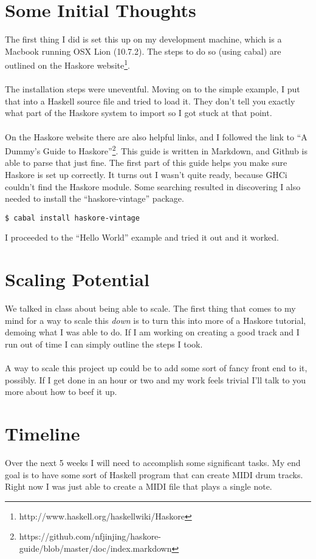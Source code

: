 \documentclass{article}
\begin{document}
\section*{Some Initial Thoughts}
The first thing I did is set this up on my development machine, which is a Macbook
running OSX Lion (10.7.2). The steps to do so (using cabal) are outlined on the Haskore 
website\footnote{http://www.haskell.org/haskellwiki/Haskore}.\\
\\
The installation steps were uneventful. Moving on to the simple example, I put that into
a Haskell source file and tried to load it. They don't tell you exactly what part of the
Haskore system to import so I got stuck at that point.\\
\\
On the Haskore website there are also helpful links, and I followed the link to
``A Dummy's Guide to Haskore''\footnote{https://github.com/nfjinjing/haskore-guide/blob/master/doc/index.markdown}.
This guide is written in Markdown, and Github is able to parse that just fine. The first part
of this guide helps you make sure Haskore is set up correctly. It turns out I wasn't quite
ready, because GHCi couldn't find the Haskore module. Some searching resulted in discovering
I also needed to install the ``haskore-vintage'' package.
\begin{verbatim}
$ cabal install haskore-vintage
\end{verbatim}
I proceeded to the ``Hello World'' example and tried it out and it worked. 

\section*{Scaling Potential}
We talked in class about being able to scale. The first thing that comes to my mind
for a way to scale this \emph{down} is to turn this into more of a Haskore tutorial,
demoing what I was able to do. If I am working on creating a good track and I run out
of time I can simply outline the steps I took.\\
\\
A way to scale this project up could be to add some sort of fancy front end to it, possibly. 
If I get done in an hour or two and my work feels trivial I'll talk to you more about how to
beef it up.

\section*{Timeline}
Over the next 5 weeks I will need to accomplish some significant tasks. My end goal is to
have some sort of Haskell program that can create MIDI drum tracks. Right now I was just able
to create a MIDI file that plays a single note.
\end{document}
